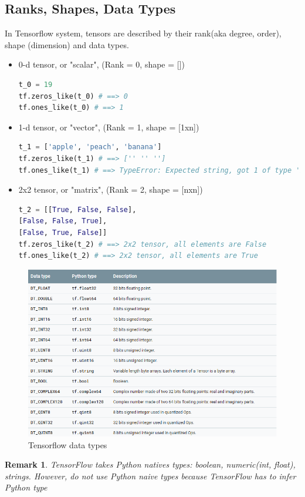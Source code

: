 \documentclass{article}
\newtheorem*{remark}{Remark}
\begin{document}
	\subsection{Ranks, Shapes, Data Types}
	In Tensorflow system, tensors are described by their rank(aka degree, order), shape (dimension) and data types.\\
	\begin{itemize}
		\item 0-d tensor, or "scalar", (Rank = 0, shape = [])
\begin{lstlisting}[language=Python,numbers=none]
t_0 = 19
tf.zeros_like(t_0) # ==> 0
tf.ones_like(t_0) # ==> 1
\end{lstlisting}
		\item 1-d tensor, or "vector", (Rank = 1, shape = [1xn])
\begin{lstlisting}[language=Python,numbers=none]
t_1 = ['apple', 'peach', 'banana']
tf.zeros_like(t_1) # ==> ['' '' '']
tf.ones_like(t_1) # ==> TypeError: Expected string, got 1 of type 'int' instead.
\end{lstlisting}	
		\newpage
		\item 2x2 tensor, or "matrix", (Rank = 2, shape = [nxn])
\begin{lstlisting}[language=Python,numbers=none]
t_2 = [[True, False, False],
[False, False, True],
[False, True, False]]
tf.zeros_like(t_2) # ==> 2x2 tensor, all elements are False
tf.ones_like(t_2) # ==> 2x2 tensor, all elements are True
\end{lstlisting}	
	\end{itemize}
	\begin{figure}[H]
		\centering
		\caption{Tensorflow data types}
		\includegraphics[width = 1.0\textwidth]{datatype.png}
	\end{figure}
	\begin{remark}
	TensorFlow takes Python natives types: boolean, numeric(int, float), strings. However, do not use Python naive types because TensorFlow has to infer Python type
	\end{remark}
	\medskip
\end{document}
